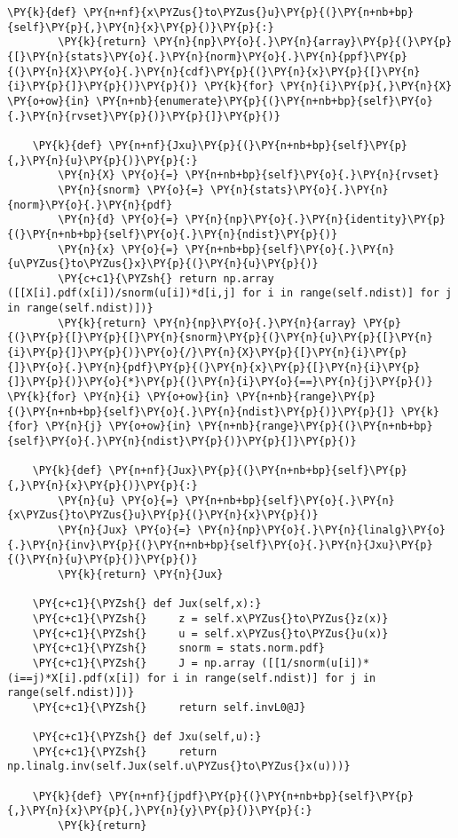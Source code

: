 \begin{tcolorbox}[breakable, size=fbox, boxrule=1pt, pad at break*=1mm,colback=cellbackground, colframe=cellborder]
\begin{Verbatim}[commandchars=\\\{\}]
    \PY{k}{def} \PY{n+nf}{x\PYZus{}to\PYZus{}u}\PY{p}{(}\PY{n+nb+bp}{self}\PY{p}{,}\PY{n}{x}\PY{p}{)}\PY{p}{:}
        \PY{k}{return} \PY{n}{np}\PY{o}{.}\PY{n}{array}\PY{p}{(}\PY{p}{[}\PY{n}{stats}\PY{o}{.}\PY{n}{norm}\PY{o}{.}\PY{n}{ppf}\PY{p}{(}\PY{n}{X}\PY{o}{.}\PY{n}{cdf}\PY{p}{(}\PY{n}{x}\PY{p}{[}\PY{n}{i}\PY{p}{]}\PY{p}{)}\PY{p}{)} \PY{k}{for} \PY{n}{i}\PY{p}{,}\PY{n}{X} \PY{o+ow}{in} \PY{n+nb}{enumerate}\PY{p}{(}\PY{n+nb+bp}{self}\PY{o}{.}\PY{n}{rvset}\PY{p}{)}\PY{p}{]}\PY{p}{)}
    
    \PY{k}{def} \PY{n+nf}{Jxu}\PY{p}{(}\PY{n+nb+bp}{self}\PY{p}{,}\PY{n}{u}\PY{p}{)}\PY{p}{:}
        \PY{n}{X} \PY{o}{=} \PY{n+nb+bp}{self}\PY{o}{.}\PY{n}{rvset}
        \PY{n}{snorm} \PY{o}{=} \PY{n}{stats}\PY{o}{.}\PY{n}{norm}\PY{o}{.}\PY{n}{pdf}
        \PY{n}{d} \PY{o}{=} \PY{n}{np}\PY{o}{.}\PY{n}{identity}\PY{p}{(}\PY{n+nb+bp}{self}\PY{o}{.}\PY{n}{ndist}\PY{p}{)}
        \PY{n}{x} \PY{o}{=} \PY{n+nb+bp}{self}\PY{o}{.}\PY{n}{u\PYZus{}to\PYZus{}x}\PY{p}{(}\PY{n}{u}\PY{p}{)}
        \PY{c+c1}{\PYZsh{} return np.array ([[X[i].pdf(x[i])/snorm(u[i])*d[i,j] for i in range(self.ndist)] for j in range(self.ndist)])}
        \PY{k}{return} \PY{n}{np}\PY{o}{.}\PY{n}{array} \PY{p}{(}\PY{p}{[}\PY{p}{[}\PY{n}{snorm}\PY{p}{(}\PY{n}{u}\PY{p}{[}\PY{n}{i}\PY{p}{]}\PY{p}{)}\PY{o}{/}\PY{n}{X}\PY{p}{[}\PY{n}{i}\PY{p}{]}\PY{o}{.}\PY{n}{pdf}\PY{p}{(}\PY{n}{x}\PY{p}{[}\PY{n}{i}\PY{p}{]}\PY{p}{)}\PY{o}{*}\PY{p}{(}\PY{n}{i}\PY{o}{==}\PY{n}{j}\PY{p}{)} \PY{k}{for} \PY{n}{i} \PY{o+ow}{in} \PY{n+nb}{range}\PY{p}{(}\PY{n+nb+bp}{self}\PY{o}{.}\PY{n}{ndist}\PY{p}{)}\PY{p}{]} \PY{k}{for} \PY{n}{j} \PY{o+ow}{in} \PY{n+nb}{range}\PY{p}{(}\PY{n+nb+bp}{self}\PY{o}{.}\PY{n}{ndist}\PY{p}{)}\PY{p}{]}\PY{p}{)}
    
    \PY{k}{def} \PY{n+nf}{Jux}\PY{p}{(}\PY{n+nb+bp}{self}\PY{p}{,}\PY{n}{x}\PY{p}{)}\PY{p}{:}
        \PY{n}{u} \PY{o}{=} \PY{n+nb+bp}{self}\PY{o}{.}\PY{n}{x\PYZus{}to\PYZus{}u}\PY{p}{(}\PY{n}{x}\PY{p}{)}
        \PY{n}{Jux} \PY{o}{=} \PY{n}{np}\PY{o}{.}\PY{n}{linalg}\PY{o}{.}\PY{n}{inv}\PY{p}{(}\PY{n+nb+bp}{self}\PY{o}{.}\PY{n}{Jxu}\PY{p}{(}\PY{n}{u}\PY{p}{)}\PY{p}{)}
        \PY{k}{return} \PY{n}{Jux}

    \PY{c+c1}{\PYZsh{} def Jux(self,x):}
    \PY{c+c1}{\PYZsh{}     z = self.x\PYZus{}to\PYZus{}z(x)}
    \PY{c+c1}{\PYZsh{}     u = self.x\PYZus{}to\PYZus{}u(x)}
    \PY{c+c1}{\PYZsh{}     snorm = stats.norm.pdf}
    \PY{c+c1}{\PYZsh{}     J = np.array ([[1/snorm(u[i])*(i==j)*X[i].pdf(x[i]) for i in range(self.ndist)] for j in range(self.ndist)])}
    \PY{c+c1}{\PYZsh{}     return self.invL0@J}

    \PY{c+c1}{\PYZsh{} def Jxu(self,u):}
    \PY{c+c1}{\PYZsh{}     return np.linalg.inv(self.Jux(self.u\PYZus{}to\PYZus{}x(u)))}

    \PY{k}{def} \PY{n+nf}{jpdf}\PY{p}{(}\PY{n+nb+bp}{self}\PY{p}{,}\PY{n}{x}\PY{p}{,}\PY{n}{y}\PY{p}{)}\PY{p}{:}
        \PY{k}{return} 
\end{Verbatim}
\end{tcolorbox}

